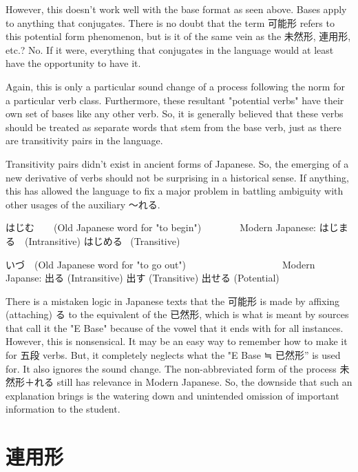 \par{ However, this doesn't work well with the base format as seen above. Bases apply to anything that conjugates. There is no doubt that the term 可能形 refers to this potential form phenomenon, but is it of the same vein as the 未然形, 連用形, etc.? No. If it were, everything that conjugates in the language would at least have the opportunity to have it. }

\par{ Again, this is only a particular sound change of a process following the norm for a particular verb class. Furthermore, these resultant "potential verbs" have their own set of bases like any other verb. So, it is generally believed that these verbs should be treated as separate words that stem from the base verb, just as there are transitivity pairs in the language. }

\par{ Transitivity pairs didn't exist in ancient forms of Japanese. So, the emerging of a new derivative of verbs should not be surprising in a historical sense. If anything, this has allowed the language to fix a major problem in battling ambiguity with other usages of the auxiliary ～れる. }

\par{はじむ　　(Old Japanese word for "to begin")　\textrightarrow 　　　Modern Japanese: はじまる　(Intransitive)    はじめる  (Transitive) }

\par{いづ　(Old Japanese word for "to go out") 　　　　　 　\textrightarrow 　　　 Modern Japanse: 出る (Intransitive) \hfill\break
 出す (Transitive) \hfill\break
 出せる (Potential) }

\par{ There is a mistaken logic in Japanese texts that the 可能形 is made by affixing (attaching) る to the equivalent of the 已然形, which is what is meant by sources that call it the "E Base" because of the vowel that it ends with for all instances. However, this is nonsensical. It may be an easy way to remember how to make it for 五段 verbs. But, it completely neglects what the "E Base ≒ 已然形” is used for. It also ignores the sound change. The non-abbreviated form of the process 未然形＋れる still has relevance in Modern Japanese. So, the downside that such an explanation brings is the watering down and unintended omission of important information to the student. }
      
\section{連用形}
 
